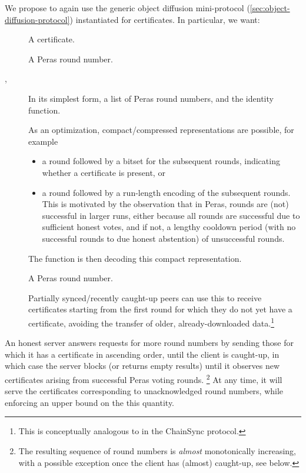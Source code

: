 We propose to again use the generic object diffusion mini-protocol (\cref{sec:object-diffusion-protocol}) instantiated for certificates.
In particular, we want:

\begin{description}
\item []
  A certificate.
\item []
  A Peras round number.
\item [, ]
  In its simplest form, a list of Peras round numbers, and the identity function.

  As an optimization, compact/compressed representations are possible, for example
  \begin{itemize}
  \item
    a round followed by a bitset for the subsequent rounds, indicating whether a certificate is present, or
  \item
    a round followed by a run-length encoding of the subsequent rounds.
    This is motivated by the observation that in Peras, rounds are (not) successful in larger runs, either because all rounds are successful due to sufficient honest votes, and if not, a lengthy cooldown period (with no successful rounds to due honest abstention) of unsuccessful rounds.
  \end{itemize}
  The  function is then decoding this compact representation.
\item []
  A Peras round number.

  Partially synced/recently caught-up peers can use this to receive certificates starting from the first round for which they do not yet have a certificate, avoiding the transfer of older, already-downloaded data.\footnote{
  This is conceptually analogous to  in the ChainSync protocol.}
\end{description}

An honest server answers requests for more round numbers by sending those for which it has a certificate in ascending order, until the client is caught-up, in which case the server blocks (or returns empty results) until it observes new certificates arising from successful Peras voting rounds.%
\footnote{The resulting sequence of round numbers is \emph{almost} monotonically increasing, with a possible exception once the client has (almost) caught-up, see below.}
At any time, it will serve the certificates corresponding to unacknowledged round numbers, while enforcing an upper bound on the this quantity.

